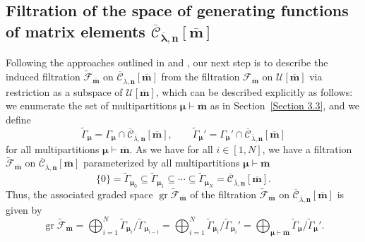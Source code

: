 \documentclass[10pt,a4paper]{amsart}
\numberwithin{equation}{section}
\DeclareMathOperator{\gr}{gr}
\begin{document}
\subsection[Filtration of the space of generating functions of matrix elements]{Filtration of the space of generating functions of matrix elements $\boldsymbol{\overline{\mathcal{C}}_{ \overline{\lambda},\mathbf{n}}[\overline{\mathbf{m}}]}$}\label{Section 3.5}

Following the approaches outlined in \cite[Section~5.6]{AKS06} and \cite[Section~5.3]{AK07}, our next step is to describe the induced filtration $\tilde{\mathcal{F}}_{\overline{\mathbf{m}}}$ on $\overline{\mathcal{C}}_{\overline{\lambda},\mathbf{n}}[\overline{\mathbf{m}}]$ from the filtration $\mathcal{F}_{\overline{\mathbf{m}}}$ on $\mathcal{U}[\overline{\mathbf{m}}]$ via restriction as a subspace of $\mathcal{U}[\overline{\mathbf{m}}]$, which can be described explicitly as follows: we enumerate the set of multipartitions $\bm{\mu}\vdash\overline{\mathbf{m}}$ as in Section~\ref{Section 3.3}, and we define
\begin{equation*}
\tilde{\Gamma}_{\bm{\mu}}=\Gamma_{\bm{\mu}}\cap\overline{\mathcal{C}}_{\overline{\lambda},\mathbf{n}}[\overline{\mathbf{m}}], \qquad
\tilde{\Gamma}_{\bm{\mu}}'=\Gamma_{\bm{\mu}}'\cap\overline{\mathcal{C}}_{\overline{\lambda},\mathbf{n}}[\overline{\mathbf{m}}]
\end{equation*}
for all multipartitions $\bm{\mu}\vdash\overline{\mathbf{m}}$. As we have  for all $i\in [1,N]$, we have a filtration~$\tilde{\mathcal{F}}_{\overline{\mathbf{m}}}$ on $\overline{ \mathcal{C}}_{\overline{\lambda},\mathbf{n}}[\overline{ \mathbf{m}}]$ parameterized by all multipartitions $\bm{\mu}\vdash\overline{\mathbf{m}}$
\begin{equation*}
\{0\}=\tilde{\Gamma}_{\bm{\mu}_0}\subseteq\tilde{\Gamma}_{\bm{ \mu}_1}\subseteq\cdots\subseteq\tilde{\Gamma}_{\bm{\mu}_N}= \overline{\mathcal{C}}_{\overline{\lambda},\mathbf{n}}[\overline{\mathbf{m}}].
\end{equation*}
Thus, the associated graded space $\gr\tilde{\mathcal{F}}_{\overline{\mathbf{m}}}$ of the filtration $\tilde{\mathcal{F}}_{\overline{\mathbf{m}}}$ on $\overline{\mathcal{C}}_{\overline{\lambda},\mathbf{n}}[\overline{\mathbf{m}}]$ is given by
\begin{equation}\label{eq:3.44}
\gr\tilde{\mathcal{F}}_{\overline{\mathbf{m}}}
=\bigoplus_{i=1}^N\tilde{\Gamma}_{\bm{\mu}_i}/\tilde{\Gamma}_{\bm{\mu}_{i-1}}
=\bigoplus_{i=1}^N\tilde{\Gamma}_{\bm{\mu}_i}/\tilde{\Gamma}_{\bm{\mu}_i}'
=\bigoplus_{\bm{\mu}\vdash\overline{\mathbf{m}}} \tilde{\Gamma}_{\bm{\mu}}/\tilde{\Gamma}_{\bm{\mu}}'.
\end{equation}
\end{document}
